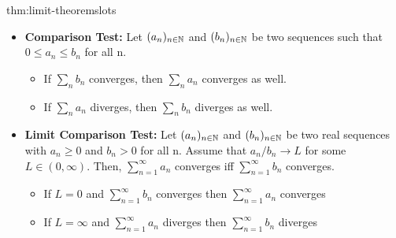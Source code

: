 \documentclass[landscape, 8pt]{extarticle}
\begin{document}
\begin{multicols}{3}
\begin{thm}{thm:limit-theorems}{lots}
\begin{itemize}
    
    \item \textbf{Comparison Test:} Let $(a_n)_{n\in\mathbb{N}}$ and $(b_n)_{n\in\mathbb{N}}$ be two sequences such that $0\leq a_n\leq b_n$ for all n.
    \renewcommand\labelitemi{\tiny$\bullet$}
    \vspace{-5pt}
    \begin{itemize}
        \setlength\itemsep{0em}
        \item If $\sum_n b_n$ converges, then $\sum_n a_n$ converges as well.
        \item If $\sum_n a_n$ diverges, then $\sum_n b_n$ diverges as well.
    \end{itemize}
    \vspace{-5pt}

    \item \textbf{Limit Comparison Test:} Let $(a_n)_{n\in\mathbb{N}}$ and $(b_n)_{n\in\mathbb{N}}$ be two real sequences with $a_n\geq0$ and $b_n > 0$ for all n. Assume that $a_n / b_n \to L$ for some $L\in(0,\infty)$. Then, $\sum_{n=1}^{\infty}  a_n$ converges iff $\sum_{n=1}^{\infty}  b_n$ converges. 
    \renewcommand\labelitemi{\tiny$\bullet$}
    \vspace{-5pt}
    \begin{itemize}
        \setlength\itemsep{0em}
        \item If $L=0$ and $\sum_{n=1}^{\infty}b_{n}$ converges then $\sum_{n=1}^{\infty} a_{n}$ converges
        \item If $L=\infty$ and $\sum_{n=1}^{\infty}a_{n}$ diverges then $\sum_{n=1}^{\infty} b_{n}$ diverges
    \end{itemize}
    \vspace{-5pt}
    

\end{itemize}
\end{thm}
\end{multicols}
\end{document}
